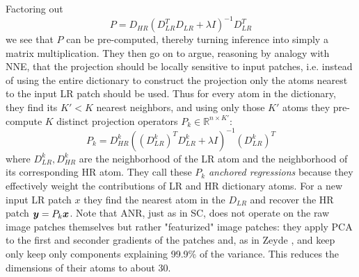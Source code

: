 Factoring out
\begin{equation}
	P = D_{HR} \left( D_{LR}^T D_{LR} + \lambda I\right)^{-1}D_{LR}^T
\end{equation}
we see that $P$ can be pre-computed, thereby turning inference into simply a matrix multiplication.
%
They then go on to argue, reasoning by analogy with NNE, that the projection should be locally sensitive to input patches, i.e. instead of using the entire dictionary to construct the projection only the atoms nearest to the input LR patch should be used.
%
Thus for every atom in the dictionary, they find its $K' < K$ nearest neighbors, and using only those $K'$ atoms they pre-compute $K$ distinct projection operators $P_k \in \mathbb{R}^{n \times K'}$:
\begin{equation}
	P_k = D_{HR}^k \left( (D_{LR}^k)^T D_{LR}^k + \lambda I\right)^{-1}(D_{LR}^k)^T
	\label{eqn:datadependentmapping}
\end{equation}
where $D_{LR}^k, D_{HR}^k$ are the neighborhood of the LR atom and the neighborhood of its corresponding HR atom.
%
They call these $P_k$ \textit{anchored regressions} because they effectively weight the contributions of LR and HR dictionary atoms.
%
For a new input LR patch $x$ they find the nearest atom in the $D_{LR}$ and recover the HR patch $\bm{y} = P_k \bm{x}$.
%
Note that ANR, just as in SC, does not operate on the raw image patches themselves but rather "featurized" image patches: they apply PCA to the first and seconder gradients of the patches and, as in Zeyde \etal\cite{Zeyde2012}, and keep only keep only components explaining 99.9\% of the variance.
%
This reduces the dimensions of their atoms to about 30.
